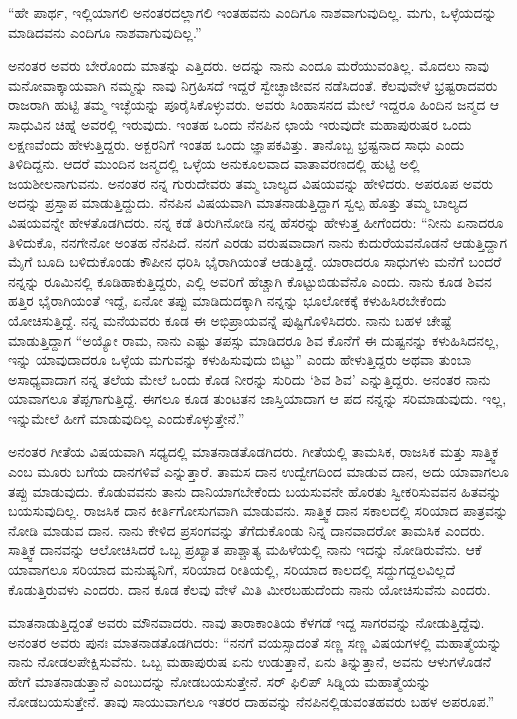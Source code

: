  “ಹೇ ಪಾರ್ಥ, ಇಲ್ಲಿಯಾಗಲಿ ಅನಂತರದಲ್ಲಾಗಲಿ ಇಂತಹವನು ಎಂದಿಗೂ ನಾಶವಾಗುವುದಿಲ್ಲ. ಮಗು, ಒಳ್ಳೆಯದನ್ನು ಮಾಡಿದವನು ಎಂದಿಗೂ ನಾಶವಾಗುವುದಿಲ್ಲ.” 

 ಅನಂತರ ಅವರು ಬೇರೊಂದು ಮಾತನ್ನು ಎತ್ತಿದರು. ಅದನ್ನು ನಾನು ಎಂದೂ ಮರೆಯುವಂತಿಲ್ಲ. ಮೊದಲು ನಾವು ಮನೋವಾಕ್ಕಾಯವಾಗಿ ನಮ್ಮನ್ನು ನಾವು ನಿಗ್ರಹಿಸದೆ ಇದ್ದರೆ ಸ್ವೇಚ್ಛಾಜೀವನ ನಡೆಸಿದಂತೆ. ಕೆಲವುವೇಳೆ ಭ್ರಷ್ಟರಾದವರು ರಾಜರಾಗಿ ಹುಟ್ಟಿ ತಮ್ಮ ಇಚ್ಛೆಯನ್ನು ಪೂರೈಸಿಕೊಳ್ಳುವರು. ಅವರು ಸಿಂಹಾಸನದ ಮೇಲೆ ಇದ್ದರೂ ಹಿಂದಿನ ಜನ್ಮದ ಆ ಸಾಧುವಿನ ಚಿಹ್ನೆ ಅವರಲ್ಲಿ ಇರುವುದು. ಇಂತಹ ಒಂದು ನೆನಪಿನ ಛಾಯೆ ಇರುವುದೇ ಮಹಾಪುರುಷರ ಒಂದು ಲಕ್ಷಣವೆಂದು ಹೇಳುತ್ತಿದ್ದರು. ಅಕ್ಬರನಿಗೆ ಇಂತಹ ಒಂದು ಜ್ಞಾಪಕವಿತ್ತು. ತಾನೊಬ್ಬ ಭ್ರಷ್ಟನಾದ ಸಾಧು ಎಂದು ತಿಳಿದಿದ್ದನು. ಆದರೆ ಮುಂದಿನ ಜನ್ಮದಲ್ಲಿ ಒಳ್ಳೆಯ ಅನುಕೂಲವಾದ ವಾತಾವರಣದಲ್ಲಿ ಹುಟ್ಟಿ ಅಲ್ಲಿ ಜಯಶೀಲನಾಗುವನು. ಅನಂತರ ನನ್ನ ಗುರುದೇವರು ತಮ್ಮ ಬಾಲ್ಯದ ವಿಷಯವನ್ನು ಹೇಳಿದರು. ಅಪರೂಪ ಅವರು ಅದನ್ನು ಪ್ರಸ್ತಾಪ ಮಾಡುತ್ತಿದ್ದುದು. ನೆನಪಿನ ವಿಷಯವಾಗಿ ಮಾತನಾಡುತ್ತಿದ್ದಾಗ ಸ್ವಲ್ಪ ಹೊತ್ತು ತಮ್ಮ ಬಾಲ್ಯದ ವಿಷಯವನ್ನೇ ಹೇಳತೊಡಗಿದರು. ನನ್ನ ಕಡೆ ತಿರುಗಿನೋಡಿ ನನ್ನ ಹೆಸರನ್ನು ಹೇಳುತ್ತ ಹೀಗೆಂದರು: “ನೀನು ಏನಾದರೂ ತಿಳಿದುಕೊ, ನನಗೇನೋ ಅಂತಹ ನೆನಪಿದೆ. ನನಗೆ ಎರಡು ವರುಷವಾದಾಗ ನಾನು ಕುದುರೆಯವನೊಡನೆ ಆಡುತ್ತಿದ್ದಾಗ ಮೈಗೆ ಬೂದಿ ಬಳಿದುಕೊಂಡು ಕೌಪೀನ ಧರಿಸಿ ಭೈರಾಗಿಯಂತೆ ಆಡುತ್ತಿದ್ದೆ. ಯಾರಾದರೂ ಸಾಧುಗಳು ಮನೆಗೆ ಬಂದರೆ ನನ್ನನ್ನು ರೂಮಿನಲ್ಲಿ ಕೂಡಿಹಾಕುತ್ತಿದ್ದರು, ಎಲ್ಲಿ ಅವರಿಗೆ ಹೆಚ್ಚಾಗಿ ಕೊಟ್ಟುಬಿಡುವೆನೊ ಎಂದು. ನಾನು ಕೂಡ ಶಿವನ ಹತ್ತಿರ ಭೈರಾಗಿಯಂತೆ ಇದ್ದೆ, ಏನೋ ತಪ್ಪು ಮಾಡಿದುದಕ್ಕಾಗಿ ನನ್ನನ್ನು ಭೂಲೋಕಕ್ಕೆ ಕಳುಹಿಸಿರಬೇಕೆಂದು ಯೋಚಿಸುತ್ತಿದ್ದೆ. ನನ್ನ ಮನೆಯವರು ಕೂಡ ಈ ಅಭಿಪ್ರಾಯವನ್ನೆ ಪುಷ್ಟಿಗೊಳಿಸಿದರು. ನಾನು ಬಹಳ ಚೇಷ್ಟೆ ಮಾಡುತ್ತಿದ್ದಾಗ “ಅಯ್ಯೋ ರಾಮ, ನಾನು ಎಷ್ಟು ತಪಸ್ಸು ಮಾಡಿದರೂ ಶಿವ ಕೊನೆಗೆ ಈ ದುಷ್ಟನನ್ನು ಕಳುಹಿಸಿದನಲ್ಲ, ಇನ್ನು ಯಾವುದಾದರೂ ಒಳ್ಳೆಯ ಮಗುವನ್ನು ಕಳುಹಿಸುವುದು ಬಿಟ್ಟು” ಎಂದು ಹೇಳುತ್ತಿದ್ದರು ಅಥವಾ ತುಂಬಾ ಅಸಾಧ್ಯವಾದಾಗ ನನ್ನ ತಲೆಯ ಮೇಲೆ ಒಂದು ಕೊಡ ನೀರನ್ನು ಸುರಿದು ‘ಶಿವ ಶಿವ’ ಎನ್ನುತ್ತಿದ್ದರು. ಅನಂತರ ನಾನು ಯಾವಾಗಲೂ ತೆಪ್ಪಗಾಗುತ್ತಿದ್ದೆ. ಈಗಲೂ ಕೂಡ ತುಂಟತನ ಜಾಸ್ತಿಯಾದಾಗ ಆ ಪದ ನನ್ನನ್ನು ಸರಿಮಾಡುವುದು. ಇಲ್ಲ, ಇನ್ನುಮೇಲೆ ಹೀಗೆ ಮಾಡುವುದಿಲ್ಲ ಎಂದುಕೊಳ್ಳುತ್ತೇನೆ.” 

 ಅನಂತರ ಗೀತೆಯ ವಿಷಯವಾಗಿ ಸಧ್ಯದಲ್ಲಿ ಮಾತನಾಡತೊಡಗಿದರು. ಗೀತೆಯಲ್ಲಿ ತಾಮಸಿಕ, ರಾಜಸಿಕ ಮತ್ತು ಸಾತ್ತ್ವಿಕ ಎಂಬ ಮೂರು ಬಗೆಯ ದಾನಗಳಿವೆ ಎನ್ನುತ್ತಾರೆ. ತಾಮಸ ದಾನ ಉದ್ವೇಗದಿಂದ ಮಾಡುವ ದಾನ, ಅದು ಯಾವಾಗಲೂ ತಪ್ಪು ಮಾಡುವುದು. ಕೊಡುವವನು ತಾನು ದಾನಿಯಾಗಬೇಕೆಂದು ಬಯಸುವನೇ ಹೊರತು ಸ್ವೀಕರಿಸುವವನ ಹಿತವನ್ನು ಬಯಸುವುದಿಲ್ಲ. ರಾಜಸಿಕ ದಾನ ಕೀರ್ತಿಗೋಸುಗವಾಗಿ ಮಾಡುವನು. ಸಾತ್ತ್ವಿಕ ದಾನ ಸಕಾಲದಲ್ಲಿ ಸರಿಯಾದ ಪಾತ್ರವನ್ನು ನೋಡಿ ಮಾಡುವ ದಾನ. ನಾನು ಕೇಳಿದ ಪ್ರಸಂಗವನ್ನು ತೆಗೆದುಕೊಂಡು ನಿನ್ನ ದಾನವಾದರೋ ತಾಮಸಿಕ ಎಂದರು. ಸಾತ್ತ್ವಿಕ ದಾನವನ್ನು ಆಲೋಚಿಸಿದರೆ ಒಬ್ಬ ಪ್ರಖ್ಯಾತ ಪಾಶ್ಚಾತ್ಯ ಮಹಿಳೆಯಲ್ಲಿ ನಾನು ಇದನ್ನು ನೋಡಿರುವೆನು. ಆಕೆ ಯಾವಾಗಲೂ ಸರಿಯಾದ ಮನುಷ್ಯನಿಗೆ, ಸರಿಯಾದ ರೀತಿಯಲ್ಲಿ, ಸರಿಯಾದ ಕಾಲದಲ್ಲಿ ಸದ್ದುಗದ್ದಲವಿಲ್ಲದೆ ಕೊಡುತ್ತಿರುವಳು ಎಂದರು. ದಾನ ಕೂಡ ಕೆಲವು ವೇಳೆ ಮಿತಿ ಮೀರಬಹುದೆಂದು ನಾನು ಯೋಚಿಸುವೆನು ಎಂದರು. 

 ಮಾತನಾಡುತ್ತಿದ್ದಂತೆ ಅವರು ಮೌನವಾದರು. ನಾವು ತಾರಾಕಾಂತಿಯ ಕೆಳಗಡೆ ಇದ್ದ ಸಾಗರವನ್ನು ನೋಡುತ್ತಿದ್ದೆವು. ಅನಂತರ ಅವರು ಪುನಃ ಮಾತನಾಡತೊಡಗಿದರು: “ನನಗೆ ವಯಸ್ಸಾದಂತೆ ಸಣ್ಣ ಸಣ್ಣ ವಿಷಯಗಳಲ್ಲಿ ಮಹಾತ್ಮೆಯನ್ನು ನಾನು ನೋಡಲಪೇಕ್ಷಿಸುವೆನು. ಒಬ್ಬ ಮಹಾಪುರುಷ ಏನು ಉಡುತ್ತಾನೆ, ಏನು ತಿನ್ನುತ್ತಾನೆ, ಅವನು ಆಳುಗಳೊಡನೆ ಹೇಗೆ ಮಾತನಾಡುತ್ತಾನೆ ಎಂಬುದನ್ನು ನೋಡಬಯಸುತ್ತೇನೆ. ಸರ್ ಫಿಲಿಪ್ ಸಿಡ್ನಿಯ ಮಹಾತ್ಮೆಯನ್ನು ನೋಡಬಯಸುತ್ತೇನೆ. ತಾವು ಸಾಯುವಾಗಲೂ ಇತರರ ದಾಹವನ್ನು ನೆನಪಿನಲ್ಲಿಡುವಂತಹವರು ಬಹಳ ಅಪರೂಪ.” 

